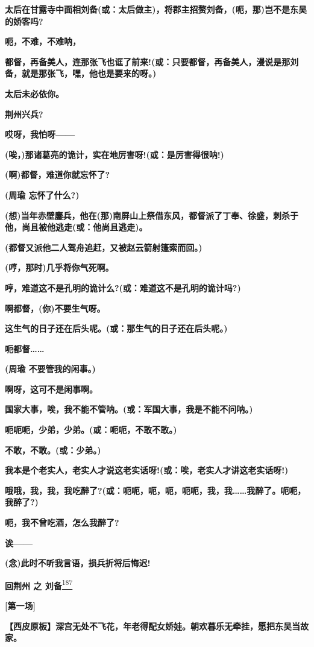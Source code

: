 \textbf{太后在甘露寺中面相刘备(或：太后做主)，将郡主招赘刘备，(呃，那)岂不是东吴的娇客吗?}

\textbf{呃，不难，不难呐，}

\textbf{都督，再备美人，连那张飞也诓了前来!(或：只要都督，再备美人，漫说是那刘备，就是那张飞，嘿，他也是要来的呀。)}

\textbf{太后未必依你。}

\textbf{荆州兴兵?}

\textbf{哎呀，我怕呀------}

\textbf{(唉，)那诸葛亮的诡计，实在地厉害呀!(或：是厉害得很呐!)}

\textbf{(啊)都督，难道你就忘怀了?}

\textbf{(周瑜 忘怀了什么?)}

\textbf{(想)当年赤壁鏖兵，他在(那)南屏山上祭借东风，都督派了丁奉、徐盛，刺杀于他，尚且被他逃走(或：他尚且逃走)。}

\textbf{(都督又派他二人驾舟追赶，又被赵云箭射篷索而回。)}

\textbf{(哼，那时)几乎将你气死啊。}

\textbf{哼，难道这不是孔明的诡计么?(或：难道这不是孔明的诡计吗?)}

\textbf{啊都督，(你)不要生气呀。}

\textbf{这生气的日子还在后头呢。(或：那生气的日子还在后头呢。)}

\textbf{呃都督\ldots{}\ldots{}}

\textbf{(周瑜 不要管我的闲事。)}

\textbf{啊呀，这可不是闲事啊。}

\textbf{国家大事，唉，我不能不管呐。(或：军国大事，我是不能不问呐。)}

\textbf{呃呃呃，少弟，少弟。(或：呃呃，不敢不敢。)}

\textbf{不敢，不敢。(或：少弟。)}

\textbf{我本是个老实人，老实人才说这老实话呀!(或：唉，老实人才讲这老实话呀!)}

\textbf{哦哦，我，我，我吃醉了?(或：呃呃，呃，呃，呃呃，我，我\ldots{}\ldots{}我醉了。呃呃，我醉了?)}

\textbf{呃，我不曾吃酒，怎么我醉了?}

\textbf{诶------}

\textbf{(念)此时不听我言语，损兵折将后悔迟!}

\textbf{回荆州 之 刘备}\protect\hyperlink{fn187}{\textsuperscript{187}}

\textbf{{[}第一场{]}}

\textbf{【西皮原板】深宫无处不飞花，年老得配女娇娃。朝欢暮乐无牵挂，愿把东吴当故家。}

